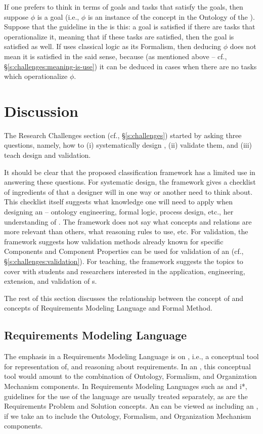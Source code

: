 \documentclass[10pt, final, conference, compsocconf]{IEEEtran}
\begin{document}
If one prefers to think in terms of goals and tasks that satisfy the goals, then suppose $\phi$ is a goal (i.e., $\phi$ is an instance of the  concept in the Ontology of the ). Suppose that the guideline in the  is this: a goal is satisfied if there are tasks that operationalize it, meaning that if these tasks are satisfied, then the goal is satisfied as well. If  uses classical logic as its Formalism, then deducing $\phi$ does not mean it is satisfied in the said sense, because (as mentioned above -- cf., \S\ref{s:challenges:meaning-is-use}) it can be deduced in cases when there are no tasks which operationalize $\phi$. 






\section{Discussion}\label{s:discussion}
The Research Challenges section (cf., \S\ref{s:challenges}) started by asking three questions, namely, how to (i) systematically design , (ii) validate them, and (iii) teach design and validation. 

It should be clear that the proposed classification framework has a limited use in answering these questions. For systematic design, the framework gives a checklist of ingredients of  that a  designer will in one way or another need to think about. This checklist itself suggests what knowledge one will need to apply when designing an  -- ontology engineering, formal logic, process design, etc.,  her understanding of . The framework does not say what concepts and relations are more relevant than others, what reasoning rules to use, etc. For validation, the framework suggests how validation methods already known for specific Components and Component Properties can be used for validation of an  (cf., \S\ref{s:challenges:validation}). For teaching, the framework suggests the topics to cover with students and researchers interested in the application, engineering, extension, and validation of s. 

The rest of this section discusses the relationship between the concept of  and concepts of Requirements Modeling Language and Formal Method.

\subsection{Requirements Modeling Language}
The emphasis in a Requirements Modeling Language is on , i.e., a conceptual tool for representation of, and reasoning about requirements. In an , this conceptual tool would amount to the combination of Ontology, Formalism, and Organization Mechanism components. In Requirements Modeling Languages such as  and i*, guidelines for the use of the language are usually treated separately, as are the Requirements Problem and Solution concepts. An  can be viewed as including an , if we take an  to include the Ontology, Formalism, and Organization Mechanism components.
\end{document}
